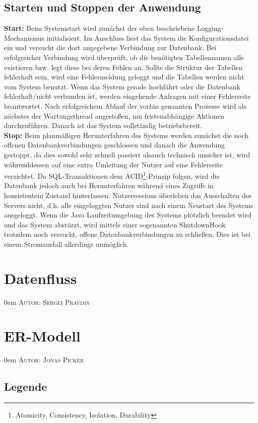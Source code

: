 \documentclass{article}
\makeatletter
\newcommand{\sectionauthor}[1]{
	{\parindent 0em \large \scshape Autor: #1 \par \nobreak \vspace*{1em}}
	\@afterheading
}
\makeatother
\begin{document}
\subsection{Starten und Stoppen der Anwendung}
\noindent \textbf{Start:} Beim Systemstart wird zunächst der oben beschriebene Logging-Mechanismus initialisiert. Im Anschluss liest das System die Konfigurationsdatei ein und versucht die dort angegebene Verbindung zur Datenbank. Bei erfolgreicher Verbindung wird überprüft, ob die benötigten Tabellennamen alle existieren bzw. legt diese bei deren Fehlen an. Sollte die Struktur der Tabellen fehlerhaft sein, wird eine Fehlermeldung geloggt und die Tabellen werden nicht vom System benutzt. Wenn das System gerade hochfährt oder die Datenbank fehlerhaft/nicht verbunden ist, werden eingehende Anfragen mit einer Fehlerseite beantwortet. Nach erfolgreichem Ablauf der vorhin genannten Prozesse wird als nächstes der Wartungsthread angestoßen, um fristenabhängige Aktionen durchzuführen. Danach ist das System vollständig betriebsbereit.\\
\textbf{Stop:} 
Beim planmäßigen Herunterfahren des Systems werden zunächst die noch offenen Datenbankverbindungen geschlossen und danach die Anwendung gestoppt, da dies sowohl sehr schnell passiert alsauch technisch unsicher ist, wird währenddessen auf eine extra Umleitung der Nutzer auf eine Fehlerseite verzichtet. Da SQL-Transaktionen dem ACID\footnote{Atomicity, Consistency, Isolation, Durability}-Prinzip folgen, wird die Datenbank jedoch auch bei Herunterfahren während eines Zugriffs in konsistentem Zustand hinterlassen. Nutzersessions überleben das Ausschalten des Servers nicht, d.h. alle eingeloggten Nutzer sind nach einem Neustart des Systems ausgeloggt. Wenn die Java Laufzeitumgebung des Systems plötzlich beendet wird und das System abstürzt, wird mittels einer sogenannten ShutdownHook trotzdem noch versucht, offene Datenbankverbindungen zu schließen. Dies ist bei einem Stromausfall allerdings unmöglich. 
\section{Datenfluss}
\sectionauthor{Sergei Pravdin}

\section{ER-Modell}
\sectionauthor{Jonas Picker}
\subsection{Legende}
\end{document}
